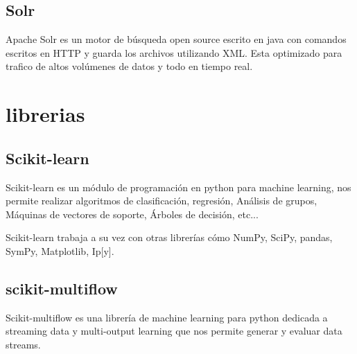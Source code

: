 \subsection{Solr}
Apache Solr es un motor de búsqueda open source escrito en java con comandos escritos en HTTP y guarda los archivos utilizando XML. Esta optimizado para trafico de altos volúmenes de datos y todo en tiempo real.\cite{pagina:Solr} 

\section{librerias}

\subsection{Scikit-learn}

Scikit-learn es un módulo de programación en python para machine learning, nos permite realizar algoritmos de clasificación, regresión, Análisis de grupos, Máquinas de vectores de soporte, Árboles de decisión, etc...

Scikit-learn trabaja a su vez con otras librerías cómo NumPy, SciPy, pandas, SymPy, Matplotlib, Ip[y].\cite{pagina:scikit-learn}

\subsection{scikit-multiflow}

Scikit-multiflow es una librería de machine learning para python dedicada a streaming data y multi-output learning que nos permite generar y evaluar data streams.\cite{pagina:scikit-mutliflow}
